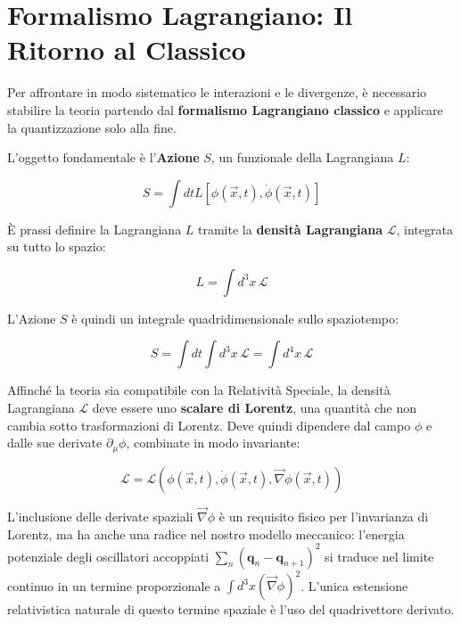 \section{Formalismo Lagrangiano: Il Ritorno al Classico}

Per affrontare in modo sistematico le interazioni e le divergenze, è necessario stabilire la teoria partendo dal \textbf{formalismo Lagrangiano classico} e applicare la quantizzazione solo alla fine.

L'oggetto fondamentale è l'\textbf{Azione} $S$, un funzionale della Lagrangiana $L$:

\begin{equation}
S = \int dt L[\phi(\vec{x},t), \dot{\phi}(\vec{x},t)]
\end{equation}

È prassi definire la Lagrangiana $L$ tramite la \textbf{densità Lagrangiana} $\mathcal{L}$, integrata su tutto lo spazio:

\begin{equation}
L = \int d^3x \, \mathcal{L}
\end{equation}

L'Azione $S$ è quindi un integrale quadridimensionale sullo spaziotempo:

\begin{equation}
S = \int dt \int d^3x \, \mathcal{L} = \int d^4x \, \mathcal{L}
\end{equation}

Affinché la teoria sia compatibile con la Relatività Speciale, la densità Lagrangiana $\mathcal{L}$ deve essere uno \textbf{scalare di Lorentz}, una quantità che non cambia sotto trasformazioni di Lorentz. Deve quindi dipendere dal campo $\phi$ e dalle sue derivate $\partial_\mu \phi$, combinate in modo invariante:

\begin{equation}
\mathcal{L} = \mathcal{L}(\phi(\vec{x},t), \dot{\phi}(\vec{x},t), \vec{\nabla}\phi(\vec{x},t))
\end{equation}

L'inclusione delle derivate spaziali $\vec{\nabla}\phi$ è un requisito fisico per l'invarianza di Lorentz, ma ha anche una radice nel nostro modello meccanico: l'energia potenziale degli oscillatori accoppiati $\sum_n (\mathbf{q}_n - \mathbf{q}_{n+1})^2$ si traduce nel limite continuo in un termine proporzionale a $\int d^3x (\vec{\nabla}\phi)^2$. L'unica estensione relativistica naturale di questo termine spaziale è l'uso del quadrivettore derivato.

